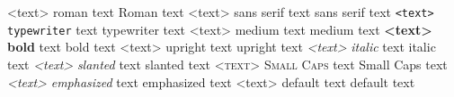 



\textrm{<text>}       \textrm{roman} text         Roman text
\textsf{<text>}       \textsf{sans serif} text    sans serif text
\texttt{<text>}       \texttt{typewriter} text    typewriter text
\textmd{<text>}       \textmd{medium} text        medium text
\textbf{<text>}       \textbf{bold} text          bold text
\textup{<text>}       \textup{upright} text       upright text
\textit{<text>}       \textit{italic} text        italic text
\textsl{<text>}       \textsl{slanted} text       slanted text
\textsc{<text>}       \textsc{Small Caps} text    Small Caps text
\emph{<text>}         \emph{emphasized} text      emphasized text
\textnormal{<text>}   \textnormal{default} text   default text

